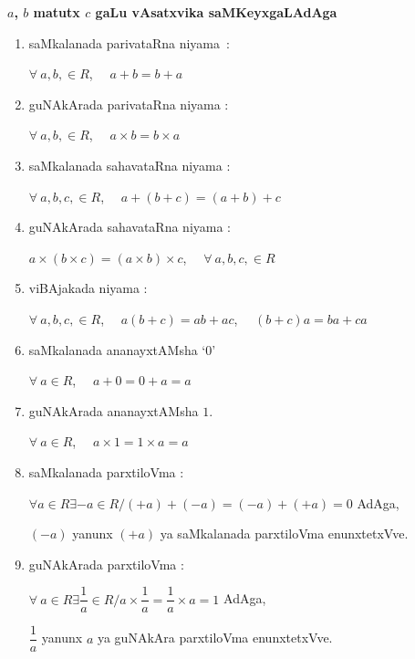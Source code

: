 {\bf \boldmath$a$, $b$ matutx $c$ gaLu vAsatxvika saMKeyxgaLAdAga}
\begin{enumerate}
\renewcommand{\labelenumi}{\eng{\theenumi.}}
\item saMkalanada parivataRna niyama~:


$\forall \ a,b,\in R$, \ \ $a+b=b+a$

\item guNAkArada parivataRna niyama :


$\forall \ a,b,\in R$, \ \ $a\times b=b\times a$

\item saMkalanada sahavataRna niyama :


$\forall \ a,b,c,\in R$, \ \ $a+(b+c)=(a+b)+c$

\item guNAkArada sahavataRna niyama :


$a\times (b\times c)=(a\times b)\times c$, \ \ $\forall \ a,b,c,\in R$

\item viBAjakada niyama :


$\forall \ a,b,c,\in R$,  \ \ $a(b+c)=ab+ac$, \ \ $(b+c)a=ba+ca$

\item saMkalanada ananayxtAMsha `$0$'


$\forall \ a\in R$, \ \ $a+0=0+a=a$

\item guNAkArada ananayxtAMsha $1$.


$\forall \ a\in R$, \ \ $a\times 1= 1\times a=a$

\item saMkalanada parxtiloVma :


$\forall a\in R\exists - a\in R/(+a)+(-a)=(-a)+(+a)=0$ AdAga, 

$(-a)$ yanunx $(+a)$ ya saMkalanada parxtiloVma enunxtetxVve.

\item guNAkArada parxtiloVma :


$\forall \ a\in R\exists \dfrac{1}{a}\in R/ a \times\dfrac{1}{a}=\dfrac{1}{a}\times a=1$ AdAga, 

$\dfrac{1}{a}$ yanunx $a$ ya guNAkAra parxtiloVma enunxtetxVve.
\end{enumerate}


